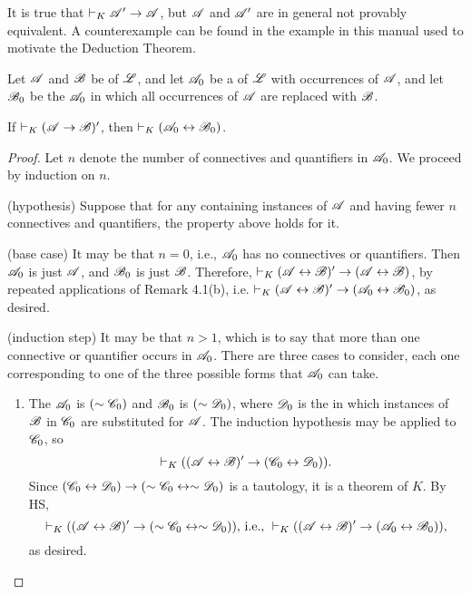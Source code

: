 It is true that \(\vdash_{K} \mathscr{A}' \rightarrow \mathscr{A}\), but \(\mathscr{A}\) and \(\mathscr{A}'\) are in general not provably equivalent. A counterexample can be found in the example in this manual used to motivate the Deduction Theorem.

\setcounter{definition}{21}
\begin{proposition}
  Let \(\mathscr{A}\) and \(\mathscr{B}\) be \wfs{} of \(\mathscr{L}\), and let \(\mathscr{A}_0\) be a \wf{} of \(\mathscr{L}\) with occurrences of \(\mathscr{A}\), and let \(\mathscr{B}_0\) be the \wf{} \(\mathscr{A}_0\) in which all occurrences of \(\mathscr{A}\) are replaced with \(\mathscr{B}\).

  If \(\vdash_{K} (\mathscr{A} \rightarrow \mathscr{B})'\), then \(\vdash_{K} (\mathscr{A}_0 \leftrightarrow \mathscr{B}_0)\).

  \begin{proof}
    Let \(n\) denote the number of connectives and quantifiers in \(\mathscr{A}_0\). We proceed by induction on \(n\).

    (hypothesis) Suppose that for any \wf{} containing instances of \(\mathscr{A}\) and having fewer \(n\) connectives and quantifiers, the property above holds for it.

    (base case) It may be that \(n = 0\), i.e., \(\mathscr{A}_0\) has no connectives or quantifiers. Then \(\mathscr{A}_0\) is just \(\mathscr{A}\), and \(\mathscr{B}_0\) is just \(\mathscr{B}\). Therefore, \(\vdash_{K} (\mathscr{A} \leftrightarrow \mathscr{B})' \rightarrow (\mathscr{A} \leftrightarrow \mathscr{B})\), by repeated applications of Remark 4.1(b), i.e. \(\vdash_{K} (\mathscr{A} \leftrightarrow \mathscr{B})' \rightarrow (\mathscr{A}_0 \leftrightarrow \mathscr{B}_0)\), as desired.

    (induction step) It may be that \(n > 1\), which is to say that more than one connective or quantifier occurs in \(\mathscr{A}_0\). There are three cases to consider, each one corresponding to one of the three possible forms that \(\mathscr{A}_0\) can take.
    \begin{enumerate}
      \item The \wf{} \(\mathscr{A}_0\) is \((\sim\mathscr{C}_0)\) and \(\mathscr{B}_0\) is \((\sim\mathscr{D}_0)\), where \(\mathscr{D}_0\) is the \wf{} in which instances of \(\mathscr{B}\) in \(\mathscr{C}_0\) are substituted for \(\mathscr{A}\). The induction hypothesis may be applied to \(\mathscr{C}_0\), so
          \[\vdash_{K} ((\mathscr{A} \leftrightarrow \mathscr{B})' \rightarrow (\mathscr{C}_0 \leftrightarrow \mathscr{D}_0)).\]
        Since \((\mathscr{C}_0 \leftrightarrow \mathscr{D}_0) \rightarrow (\sim\mathscr{C}_0 \leftrightarrow \sim\mathscr{D}_0)\) is a tautology, it is a theorem of \(K\). By HS,
          \[\vdash_{K} ((\mathscr{A} \leftrightarrow \mathscr{B})' \rightarrow (\sim\mathscr{C}_0 \leftrightarrow \sim\mathscr{D}_0)) \text{, i.e., } \vdash_{K} ((\mathscr{A} \leftrightarrow \mathscr{B})' \rightarrow (\mathscr{A}_0 \leftrightarrow \mathscr{B}_0)),\]
          as desired.


\end{enumerate}
\end{proof}
\end{proposition}
